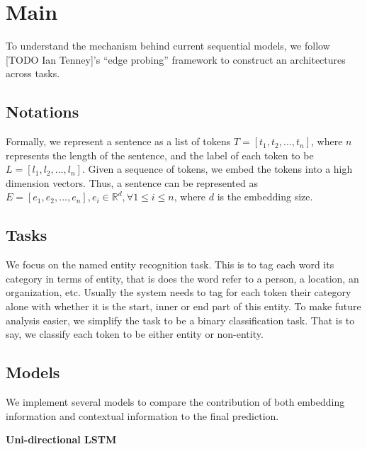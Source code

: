 \documentclass{article}
\begin{document}

\section{Main}

To understand the mechanism behind current sequential models, we follow [TODO Ian Tenney]'s ``edge probing'' framework to construct an architectures across tasks. 

\subsection{Notations}
Formally, we represent a sentence as a list of tokens $T = [t_1, t_2, ... , t_n]$, where $n$ represents the length of the sentence, and the label of each token to be $L = [l_1, l_2, ... , l_n]$. Given a sequence of tokens, we embed the tokens into a high dimension vectors. Thus, a sentence can be represented as $E = [e_1, e_2, ... , e_n], e_i \in \mathbb{R}^d, \forall 1 \leq i \leq n$, where $d$ is the embedding size.

\subsection{Tasks}
We focus on the named entity recognition task. This is to tag each word its category in terms of entity, that is does the word refer to a person, a location, an organization, etc. Usually the system needs to tag for each token their category alone with whether it is the start, inner or end part of this entity. To make future analysis easier, we simplify the task to be a binary classification task. That is to say, we classify each token to be either entity or non-entity.

\subsection{Models}

We implement several models to compare the contribution of both embedding information and contextual information to the final prediction.

\textbf{Uni-directional LSTM}
\end{document}
